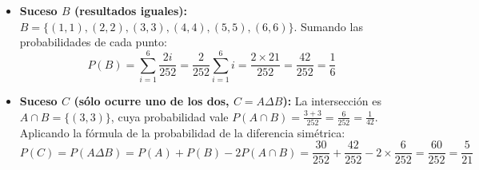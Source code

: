\begin{problema}
\begin{itemize}
    \item \textbf{Suceso $B$ (resultados iguales):}
    $B = \{(1,1), (2,2), (3,3), (4,4), (5,5), (6,6)\}$. Sumando las probabilidades de cada punto:
    \[P(B) = \sum_{i=1}^6 \frac{2i}{252} = \frac{2}{252} \sum_{i=1}^6 i = \frac{2 \times 21}{252} = \frac{42}{252} = \frac{1}{6}\]

    \item \textbf{Suceso $C$ (sólo ocurre uno de los dos, $C = A \Delta B$):}
    La intersección es $A \cap B = \{(3,3)\}$, cuya probabilidad vale $P(A \cap B) = \frac{3+3}{252} = \frac{6}{252} = \frac{1}{42}$.
    Aplicando la fórmula de la probabilidad de la diferencia simétrica:
    \[P(C) = P(A \Delta B) = P(A) + P(B) - 2 P(A \cap B) = \frac{30}{252} + \frac{42}{252} - 2 \times \frac{6}{252} = \frac{60}{252} = \frac{5}{21}\]
\end{itemize}
\end{problema}